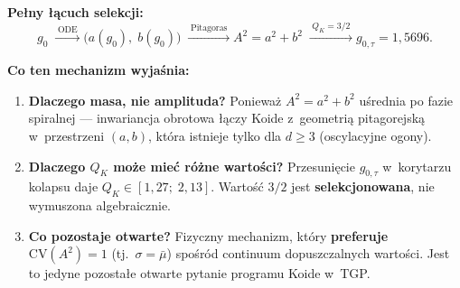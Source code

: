\begin{proposition}[Pitagorejski mechanizm selekcji $Q_K = 3/2$]
\medskip\noindent
\textbf{Pe\l{}ny \l{}\k{a}cuch selekcji:}
\begin{equation}\label{eq:T-selection-chain}
  \boxed{
  g_0
  \;\xrightarrow{\;\text{ODE}\;}
  \bigl(a(g_0),\; b(g_0)\bigr)
  \;\xrightarrow{\;\text{Pitagoras}\;}
  A^2 = a^2 + b^2
  \;\xrightarrow{\;Q_K = 3/2\;}
  g_{0,\tau} = 1{,}5696.}
\end{equation}

\medskip\noindent
\textbf{Co ten mechanizm wyja\'snia:}
\begin{enumerate}[nosep]
  \item \textbf{Dlaczego masa, nie amplituda?}
    Poniewa\.z $A^2 = a^2+b^2$ u\'srednia po fazie spiralnej ---
    inwariancja obrotowa \l{}\k{a}czy Koide z~geometri\k{a}
    pitagorejsk\k{a} w~przestrzeni $(a,b)$, kt\'ora istnieje
    tylko dla $d \geq 3$ (oscylacyjne ogony).
  \item \textbf{Dlaczego $Q_K$ mo\.ze mie\'c r\'o\.zne warto\'sci?}
    Przesuni\k{e}cie $g_{0,\tau}$ w~korytarzu kolapsu
    daje $Q_K \in [1{,}27;\; 2{,}13]$. Warto\'s\'c $3/2$ jest
    \textbf{selekcjonowana}, nie wymuszona algebraicznie.
  \item \textbf{Co pozostaje otwarte?}
    Fizyczny mechanizm, kt\'ory \textbf{preferuje}
    $\mathrm{CV}(A^2) = 1$ (tj.\ $\sigma = \bar\mu$) spo\'sr\'od
    continuum dopuszczalnych warto\'sci.
    Jest to jedyne pozosta\l{}e otwarte pytanie
    programu Koide w~TGP.
\end{enumerate}
\end{proposition}

